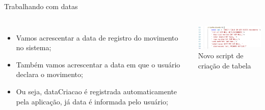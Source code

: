 \documentclass{beamer}
\begin{document}
    \begin{frame}[label=lists]{Trabalhando com datas}
      \begin{columns}[onlytextwidth]
          \begin{itemize}
            \item Vamos acrescentar a data de registro do movimento no sistema;
            \item Também vamos acrescentar a data em que o usuário declara o movimento;
            \item Ou seja, dataCriacao é registrada automaticamente pela aplicação, já data é informada pelo usuário;
          \end{itemize}
            \includegraphics[width=60mm]{resources/aula9_2.png}\\
            \tiny{Novo script de criação de tabela}
      \end{columns}
    \end{frame}

\end{document}
